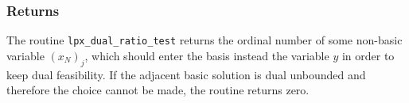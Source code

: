 \subsubsection*{Returns}

The routine \verb|lpx_dual_ratio_test| returns the ordinal number of
some non-basic variable $(x_N)_j$, which should enter the basis instead
the variable $y$ in order to keep dual feasibility. If the adjacent
basic solution is dual unbounded and therefore the choice cannot be
made, the routine returns zero.


